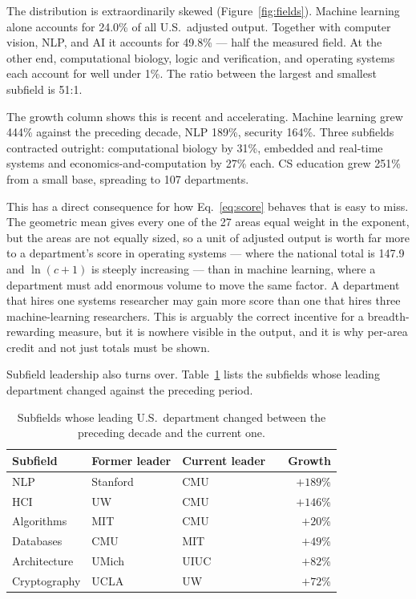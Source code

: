 \documentclass[11pt]{article}
\begin{document}
The distribution is extraordinarily skewed (Figure~\ref{fig:fields}). Machine
learning alone accounts for 24.0\% of all U.S.\ adjusted output. Together with
computer vision, NLP, and AI it accounts for 49.8\% --- half the measured
field. At the other end, computational biology, logic and verification, and
operating systems each account for well under 1\%. The ratio between the
largest and smallest subfield is 51:1.

The growth column shows this is recent and accelerating. Machine learning grew
444\% against the preceding decade, NLP 189\%, security 164\%. Three subfields
contracted outright: computational biology by 31\%, embedded and real-time
systems and economics-and-computation by 27\% each. CS education grew 251\%
from a small base, spreading to 107 departments.

This has a direct consequence for how Eq.~\ref{eq:score} behaves that is easy
to miss. The geometric mean gives every one of the 27 areas equal weight in the
exponent, but the areas are not equally sized, so a unit of adjusted output is
worth far more to a department's score in operating systems --- where the
national total is 147.9 and $\ln(c+1)$ is steeply increasing --- than in
machine learning, where a department must add enormous volume to move the same
factor. A department that hires one systems researcher may gain more score than
one that hires three machine-learning researchers. This is arguably the correct
incentive for a breadth-rewarding measure, but it is nowhere visible in the
output, and it is why per-area credit and not just totals must be shown.

Subfield leadership also turns over. Table~\ref{tab:fieldlead} lists the
subfields whose leading department changed against the preceding period.

\begin{table}[t]
\centering
\caption{Subfields whose leading U.S.\ department changed between the preceding
decade and the current one.}
\label{tab:fieldlead}
\begin{tabular}{llll r}
\toprule
Subfield & Former leader & Current leader & & Growth \\
\midrule
NLP          & Stanford & CMU          & & $+189$\% \\
HCI          & UW       & CMU          & & $+146$\% \\
Algorithms   & MIT      & CMU          & & $+20$\% \\
Databases    & CMU      & MIT          & & $+49$\% \\
Architecture & UMich    & UIUC         & & $+82$\% \\
Cryptography & UCLA     & UW           & & $+72$\% \\
\bottomrule
\end{tabular}
\end{table}
\end{document}
